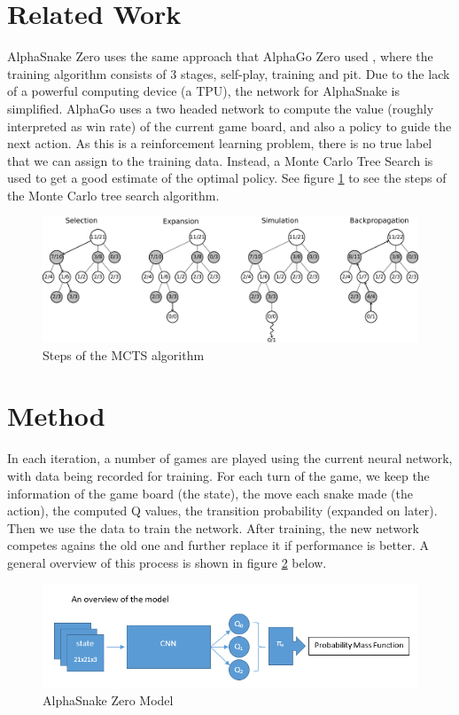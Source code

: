 \documentclass{article}
\begin{document}
\section{Related Work}

AlphaSnake Zero uses the same approach that AlphaGo Zero used
\cite{AlphaGoZeroPaper}, where the training algorithm consists of 3 stages,
self-play, training and pit. Due to the lack of a powerful computing device (a
TPU), the network for AlphaSnake is simplified. AlphaGo uses a two headed
network to compute the value (roughly interpreted as win rate) of the current
game board, and also a policy to guide the next action. As this is a
reinforcement learning problem, there is no true label that we can assign to the
training data. Instead, a Monte Carlo Tree Search is used to get a good
estimate of the optimal policy. See figure \ref{fig:mcts} to see the steps of
the Monte Carlo tree search algorithm.

\begin{figure}[!ht]
  \centering
  \includegraphics[width=12cm]{MCTS}
  \caption{Steps of the MCTS algorithm}
  \label{fig:mcts}
\end{figure}

\FloatBarrier

\section{Method}

In each iteration, a number of games are played using the current neural
network, with data being recorded for training. For each turn of the game, we keep
the information of the game board (the state), the move each snake made (the
action), the computed Q values, the transition probability (expanded on later).
Then we use the data to train the network. After training, the new network competes
agains the old one and further replace it if performance is better. A general
overview of this process is shown in figure \ref{fig:overview_of_model} below.

\begin{figure}[!ht]
  \centering
  \includegraphics[width=\linewidth]{overview_of_model}
  \caption{AlphaSnake Zero Model}
  \label{fig:overview_of_model}
\end{figure}
\end{document}
